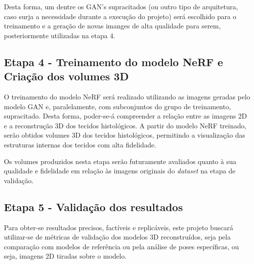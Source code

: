 Desta forma, um dentre os GAN's supracitados (ou outro tipo de arquitetura, caso surja a necessidade durante a execução do projeto) será escolhido para o treinamento e a geração de novas imanges de alta qualidade para serem, posteriormente utilizadas na etapa 4.


\subsection{Etapa 4 - Treinamento do modelo NeRF e Criação dos volumes 3D}

O treinamento do modelo NeRF será realizado utilizando as imagens geradas pelo modelo GAN e, paralelamente, com subconjuntos do grupo de treinamento, supracitado. Desta forma, poder-se-á compreender a relação entre as imagens 2D e a reconstrução 3D dos tecidos histológicos. A partir do modelo NeRF treinado, serão obtidos volumes 3D dos tecidos histológicos, permitindo a visualização das estruturas internas dos tecidos com alta fidelidade.


Os volumes produzidos nesta etapa serão futuramente avaliados quanto à sua qualidade e fidelidade em relação às imagens originais do \textit{dataset} na etapa de validação. 

\subsection{Etapa 5 - Validação dos resultados}

Para obter-se resultados precisos, factíveis e replicáveis, este projeto buscará utilizar-se de métricas de validação dos modelos 3D reconstruídos, seja pela comparação com modelos de referência ou pela análise de poses específicas, ou seja, imagens 2D tiradas sobre o modelo.

